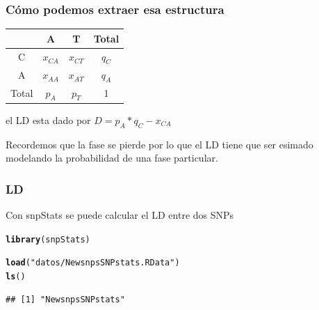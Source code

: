 \documentclass{beamer}\usepackage[]{graphicx}\usepackage[]{color}
\makeatletter
\newcommand{\hlstr}[1]{\textcolor[rgb]{0.192,0.494,0.8}{#1}}%
\newcommand{\hlstd}[1]{\textcolor[rgb]{0.345,0.345,0.345}{#1}}%
\newcommand{\hlkwd}[1]{\textcolor[rgb]{0.737,0.353,0.396}{\textbf{#1}}}%
\newenvironment{kframe}{%
 \def\at@end@of@kframe{}%
 \ifinner\ifhmode%
  \def\at@end@of@kframe{\end{minipage}}%
  \begin{minipage}{\columnwidth}%
 \fi\fi%
 \def\FrameCommand##1{\hskip\@totalleftmargin \hskip-\fboxsep
 \colorbox{shadecolor}{##1}\hskip-\fboxsep
     \hskip-\linewidth \hskip-\@totalleftmargin \hskip\columnwidth}%
 \MakeFramed {\advance\hsize-\width
   \@totalleftmargin\z@ \linewidth\hsize
   \@setminipage}}%
 {\par\unskip\endMakeFramed%
 \at@end@of@kframe}
\newenvironment{knitrout}{}{} %
\makeatother
\begin{document}
\begin{frame}[fragile]
\frametitle{C\'omo podemos extraer esa estructura}
\begin{table}[]
\centering
\begin{tabular}{c|cc|c}
  & A & T &  Total \\ \hline
C &  $x_{CA}$  &  $x_{CT}$  &  $q_C$ \\
A &  $x_{AA}$  &  $x_{AT}$  &  $q_A$  \\ \hline
Total & $p_A$  &  $p_T$  &   1 \\
\end{tabular}
\end{table}
el LD esta dado por $D=p_A*q_C - x_{CA}$

Recordemos que la fase se pierde por lo que el LD tiene que ser esimado modelando la probabilidad de una fase particular.

\end{frame}


\begin{frame}[fragile]
\frametitle{LD}
Con snpStats se puede calcular el LD entre dos SNPs

\begin{knitrout}\footnotesize
{}\color{fgcolor}\begin{kframe}
\begin{alltt}
\hlkwd{library}\hlstd{(snpStats)}
\end{alltt}
\end{kframe}
\end{knitrout}

\begin{knitrout}\footnotesize
{}\color{fgcolor}\begin{kframe}
\begin{alltt}
\hlkwd{load}\hlstd{(}\hlstr{"datos/NewsnpsSNPstats.RData"}\hlstd{)}
\hlkwd{ls}\hlstd{()}
\end{alltt}
\begin{verbatim}
## [1] "NewsnpsSNPstats"
\end{verbatim}
\end{kframe}
\end{knitrout}
\end{frame}
\end{document}
